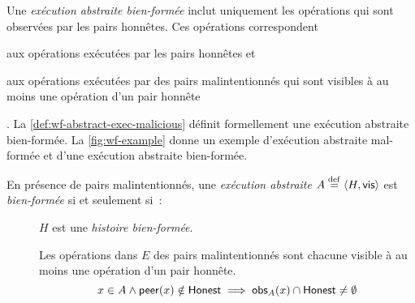 Une \emph{exécution abstraite bien-formée} inclut uniquement les opérations qui sont observées par les pairs honnêtes.
Ces opérations correspondent \begin{inlinelist}
    \item aux opérations exécutées par les pairs honnêtes et
    \item aux opérations exécutées par des pairs malintentionnés qui sont visibles à au moins une opération d'un pair honnête
\end{inlinelist}.
La \autoref{def:wf-abstract-exec-malicious} définit formellement une exécution abstraite bien-formée.
La \autoref{fig:wf-example} donne un exemple d'exécution abstraite mal-formée et d'une exécution abstraite bien-formée.

\begin{definition}\label{def:wf-abstract-exec-malicious}
    En présence de pairs malintentionnés, une \emph{exécution abstraite} $A \defeq \tuple*{H, \trm{vis}}$ est \emph{bien-formée} si et seulement si~:
    \begin{description}
      \item[] $H$ est une \emph{histoire bien-formée}.
    
      \item[] Les opérations dans $E$ des pairs malintentionnés sont chacune visible à au moins une opération d'un pair honnête.
      \begin{equation*}
        x \in A \land \trm{peer}(x) \notin \trm{Honest} \implies \trm{obs}_A(x) \cap \trm{Honest} \neq \emptyset
      \end{equation*}
    \end{description}
\end{definition}

